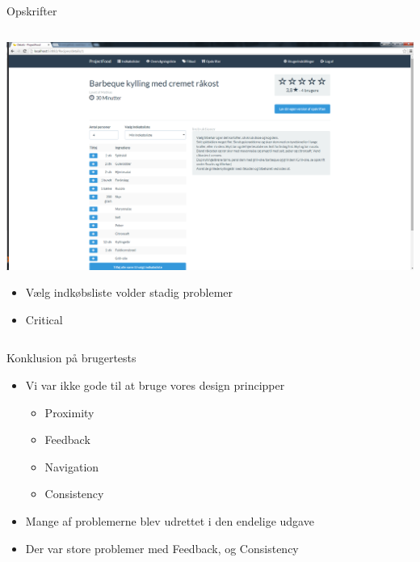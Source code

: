 \begin{frame}{Opskrifter}

	
	\begin{minipage}[0.3\textheight]{\textwidth}
	\begin{columns}[T]
	\begin{column}{1\textwidth}
	 \includegraphics[width=1\textwidth,height=1\textheight,keepaspectratio, trim={1cm 0 0 16mm}, clip]{images/Screenshots/PickedRecipe.png}
	 
	 	\begin{itemize}
	 		\item Vælg indkøbsliste volder stadig problemer
	 		\item Critical
	 	\end{itemize}
	
	\end{column}

	\end{columns}

  \end{minipage}
	
\end{frame}

\begin{frame}{Konklusion på brugertests}	
	
\begin{itemize}
	\item Vi var ikke gode til at bruge vores design principper
		\begin{itemize}
			\item Proximity
			\item Feedback
			\item Navigation
			\item Consistency
		\end{itemize}
	\item Mange af problemerne blev udrettet i den endelige udgave
	\item Der var store problemer med Feedback, og Consistency
\end{itemize}
  
\end{frame}


